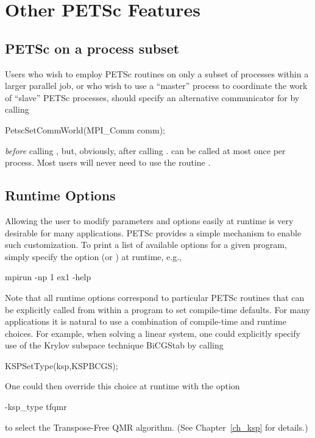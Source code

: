 {{%
\chapter{Other PETSc Features}

\section{PETSc on a process subset}

Users who wish to employ PETSc routines on only a subset
of processes within a larger parallel job, or who wish to use a
``master'' process to coordinate the work of ``slave'' PETSc
processes, should specify an alternative communicator for  by calling 
\begin{tabbing}
  PetscSetCommWorld(MPI\_Comm comm);
\end{tabbing}
{\em before} calling , but, obviously, after
calling .  can be called
at most once per process. Most users will never need to use the routine
.

\section{Runtime Options}  
\label{sec_options}

Allowing the user to modify parameters and options easily at runtime
is very desirable for many applications.  PETSc provides a simple
mechanism to enable such customization.  To print a list of
available options for a given program, simply specify the option 
 (or ) at runtime, e.g.,  
\begin{tabbing}
    mpirun -np 1 ex1 -help
\end{tabbing}

Note that all runtime options correspond to particular PETSc routines
that can be explicitly called from within a program to set compile-time
defaults.   For many applications it is natural to use a combination
of compile-time and runtime choices.  For example, when solving a linear
system, one could explicitly specify use of the Krylov subspace
technique BiCGStab by calling
\begin{tabbing}
   KSPSetType(ksp,KSPBCGS);
\end{tabbing}
One could then override this choice at runtime with the option
\begin{tabbing}
    -ksp\_type tfqmr
\end{tabbing}
to select the Transpose-Free QMR algorithm. (See Chapter~\ref{ch_ksp} for details.)

}}
